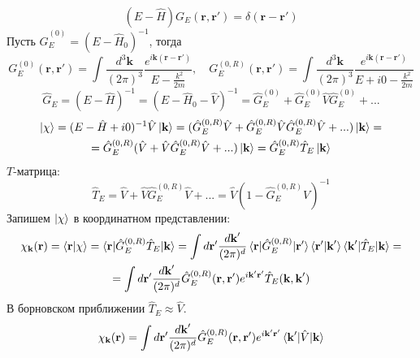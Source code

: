\documentclass[12pt]{article}
\theoremstyle{definition}
\begin{document}
\begin{equation}
    (E-\hat{H})G_E(\textbf{r},\textbf{r}')=\delta(\textbf{r}-\textbf{r}')
\end{equation}
Пусть $\hat{G}^{(0)}_E=(E-\hat{H}_0)^{-1}$, тогда
\begin{equation}
    G^{(0)}_E(\textbf{r},\textbf{r}')=\int\frac{d^3\textbf{k}}{(2\pi)^3}\frac{e^{i\textbf{k}(\textbf{r}-\textbf{r}')}}{E-\frac{k^2}{2m}},\quad G^{(0,R)}_E(\textbf{r},\textbf{r}')=\int\frac{d^3\textbf{k}}{(2\pi)^3}\frac{e^{i\textbf{k}(\textbf{r}-\textbf{r}')}}{E+i0-\frac{k^2}{2m}}
\end{equation}
\begin{equation}
    \hat{G}_E=(E-\hat{H})^{-1}=(E-\hat{H}_0-\hat{V})^{-1}=\hat{G}^{(0)}_E+\hat{G}^{(0)}_E\hat{V}\hat{G}^{(0)}_E+...
\end{equation}
\begin{multline}
    \ket{\chi}=(E-\hat{H}+i0)^{-1}\hat{V}\ket{\textbf{k}}=(\hat{G}^{(0,R)}_E\hat{V}+\hat{G}^{(0,R)}_E\hat{V}\hat{G}^{(0,R)}_E\hat{V}+...)\ket{\textbf{k}}=\\=\hat{G}^{(0,R)}_E(\hat{V}+\hat{V}\hat{G}^{(0,R)}_E\hat{V}+...)\ket{\textbf{k}}=\hat{G}^{(0,R)}_E\hat{T}_E\ket{\textbf{k}} 
\end{multline}
$T$-матрица:
\begin{equation}
    \hat{T}_E=\hat{V}+\hat{V}\hat{G}^{(0,R)}_E\hat{V}+...=\hat{V}(1-\hat{G}^{(0,R)}_EV)^{-1}
\end{equation}
Запишем $\ket{\chi}$ в координатном представлении:
\begin{multline}
    \chi_{\textbf{k}}(\textbf{r})=\braket{\textbf{r}|\chi}=\braket{\textbf{r}|\hat{G}^{(0,R)}_E\hat{T}_E|\textbf{k}}=\int d\textbf{r}'\frac{d\textbf{k}'}{(2\pi)^d}\braket{\textbf{r}|\hat{G}^{(0,R)}_E|\textbf{r}'}\braket{\textbf{r}'|\textbf{k}'}\braket{\textbf{k}'|\hat{T}_E|\textbf{k}}=\\=\int d\textbf{r}'\frac{d\textbf{k}'}{(2\pi)^d}\hat{G}^{(0,R)}_E(\textbf{r},\textbf{r}')e^{i\textbf{k}'\textbf{r}'}\hat{T}_E(\textbf{k},\textbf{k}')
\end{multline}
В борновском приближении $\hat{T}_E\approx\hat{V}$.
\begin{equation}
    \chi_{\textbf{k}}(\textbf{r})=\int d\textbf{r}'\frac{d\textbf{k}'}{(2\pi)^d}\hat{G}^{(0,R)}_E(\textbf{r},\textbf{r}')e^{i\textbf{k}'\textbf{r}'}\braket{\textbf{k}'|\hat{V}|\textbf{k}}
\end{equation}
\end{document}
